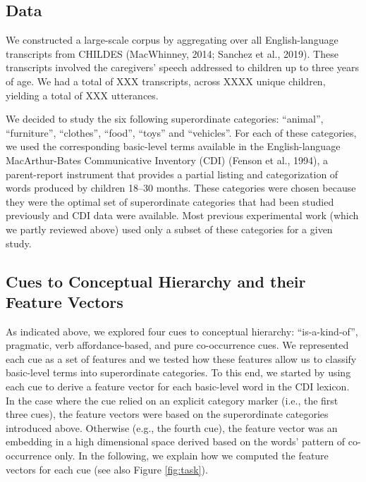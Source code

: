 \documentclass[10pt, letterpaper]{article}
\begin{document}
\hypertarget{data}{%
\subsection{Data}\label{data}}

We constructed a large-scale corpus by aggregating over all
English-language transcripts from CHILDES (MacWhinney, 2014; Sanchez et
al., 2019). These transcripts involved the caregivers' speech addressed
to children up to three years of age. We had a total of XXX transcripts,
across XXXX unique children, yielding a total of XXX utterances.

We decided to study the six following superordinate categories:
``animal'', ``furniture'', ``clothes'', ``food'', ``toys'' and
``vehicles''. For each of these categories, we used the corresponding
basic-level terms available in the English-language MacArthur-Bates
Communicative Inventory (CDI) (Fenson et al., 1994), a parent-report
instrument that provides a partial listing and categorization of words
produced by children 18--30 months. These categories were chosen because
they were the optimal set of superordinate categories that had been
studied previously and CDI data were available. Most previous
experimental work (which we partly reviewed above) used only a subset of
these categories for a given study.

\hypertarget{cues-to-conceptual-hierarchy-and-their-feature-vectors}{%
\subsection{Cues to Conceptual Hierarchy and their Feature
Vectors}\label{cues-to-conceptual-hierarchy-and-their-feature-vectors}}

As indicated above, we explored four cues to conceptual hierarchy:
``is-a-kind-of'', pragmatic, verb affordance-based, and pure
co-occurrence cues. We represented each cue as a set of features and we
tested how these features allow us to classify basic-level terms into
superordinate categories. To this end, we started by using each cue to
derive a feature vector for each basic-level word in the CDI lexicon. In
the case where the cue relied on an explicit category marker (i.e., the
first three cues), the feature vectors were based on the superordinate
categories introduced above. Otherwise (e.g., the fourth cue), the
feature vector was an embedding in a high dimensional space derived
based on the words' pattern of co-occurrence only. In the following, we
explain how we computed the feature vectors for each cue (see also
Figure \ref{fig:task}).
\end{document}
